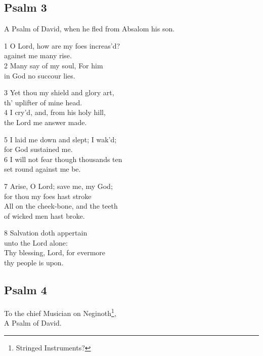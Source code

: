 \begin{center}
\quad{}\quad{}
\end{center}

\subsection*{Psalm 3}

A Psalm of David, when he fled from Absalom his son.

1 O Lord, how are my foes increas’d?\\
against me many rise.\\
2 Many say of my soul, For him\\
in God no succour lies.

3 Yet thou my shield and glory art,\\
th’ uplifter of mine head.\\
4 I cry’d, and, from his holy hill,\\
the Lord me answer made.

5 I laid me down and slept; I wak’d;\\
for God sustained me.\\
6 I will not fear though thousands ten\\
set round against me be.

7 Arise, O Lord; save me, my God;\\
for thou my foes hast stroke\\
All on the cheek-bone, and the teeth\\
of wicked men hast broke.

8 Salvation doth appertain\\
unto the Lord alone:\\
Thy blessing, Lord, for evermore\\
thy people is upon.

\begin{center}
\quad{}\quad{}
\end{center}


\subsection*{Psalm 4 }


To the chief Musician on Neginoth\footnote{Stringed Instruments?},\\
A Psalm of David.

